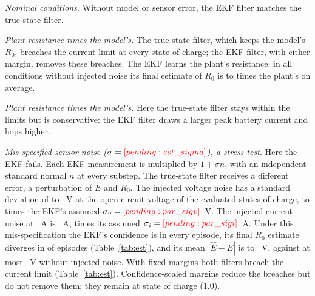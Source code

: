 \emph{Nominal conditions.} Without model or sensor error, the EKF filter matches the true-state filter.

\emph{Plant resistance  times the model's.} The true-state filter, which keeps the model's $R_0$, breaches the current limit at every state of charge; the EKF filter, with either margin, removes these breaches. The EKF learns the plant's resistance: in all conditions without injected noise its final estimate of $R_0$ is  to  times the plant's on average.

\emph{Plant resistance  times the model's.} Here the true-state filter stays within the limits but is conservative: the EKF filter draws a larger peak battery current and hops higher.

\emph{Mis-specified sensor noise ($\sigma=\res{est_sigma}$), a stress test.} Here the EKF fails. Each EKF measurement is multiplied by $1+\sigma n$, with an independent standard normal $n$ at every substep. The true-state filter receives a different error, a perturbation of $E$ and $R_0$. The injected voltage noise has a standard deviation of  to ~V at the open-circuit voltage of the evaluated states of charge,  to  times the EKF's assumed $\sigma_v=\res{par_sigv}$~V. The injected current noise at ~A is ~A,  times its assumed $\sigma_i=\res{par_sigi}$~A. Under this mis-specification the EKF's confidence is  in every episode, its final $R_0$ estimate diverges in  of  episodes (Table~\ref{tab:est}), and its mean $|\hat E - E|$ is  to ~V, against at most ~V without injected noise. With fixed margins both filters breach the current limit (Table~\ref{tab:est}). Confidence-scaled margins reduce the breaches but do not remove them; they remain at  state of charge (1.0).


